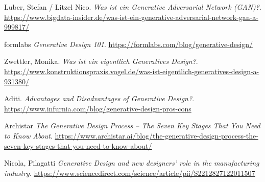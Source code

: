 \begin{thebibliography}{99}
     Luber, Stefan / Litzel Nico. \textit{Was ist ein Generative Adversarial Network (GAN)?}. \url{https://www.bigdata-insider.de/was-ist-ein-generative-adversarial-network-gan-a-999817/}

     formlabs \textit{Generative Design 101}. \url{https://formlabs.com/blog/generative-design/}

     Zwettler, Monika. \textit{Was ist ein eigentlich Generatives Design?}. \url{https://www.konstruktionspraxis.vogel.de/was-ist-eigentlich-generatives-design-a-931380/}

     Aditi. \textit{Advantages and Disadvantages of Generative Design?}. \url{https://www.infurnia.com/blog/generative-design-pros-cons}

     Archistar \textit{The Generative Design Process – The Seven Key Stages That You Need to Know About}. \url{https://www.archistar.ai/blog/the-generative-design-process-the-seven-key-stages-that-you-need-to-know-about/}

     Nicola, Pilagatti \textit{Generative Design and new designers’ role in the manufacturing industry}. \url{https://www.sciencedirect.com/science/article/pii/S2212827122011507}
    
\end{thebibliography}